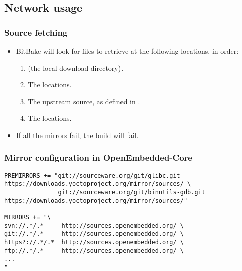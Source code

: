 \subsection{Network usage}

\begin{frame}
  \frametitle{Source fetching}
  \begin{itemize}
    \item BitBake will look for files to retrieve at the following
      locations, in order:
      \begin{enumerate}
        \item {} (the local download directory).
        \item The  locations.
        \item The upstream source, as defined in .
        \item The  locations.
      \end{enumerate}
    \item If all the mirrors fail, the build will fail.
  \end{itemize}
\end{frame}

\begin{frame}[fragile]
  \frametitle{Mirror configuration in OpenEmbedded-Core}
  \begin{block}{}
    \begin{verbatim}
PREMIRRORS += "git://sourceware.org/git/glibc.git        https://downloads.yoctoproject.org/mirror/sources/ \
               git://sourceware.org/git/binutils-gdb.git https://downloads.yoctoproject.org/mirror/sources/"

MIRRORS += "\
svn://.*/.*     http://sources.openembedded.org/ \
git://.*/.*     http://sources.openembedded.org/ \
https?://.*/.*  http://sources.openembedded.org/ \
ftp://.*/.*     http://sources.openembedded.org/ \
...
"
    \end{verbatim}
  \end{block}
\end{frame}

